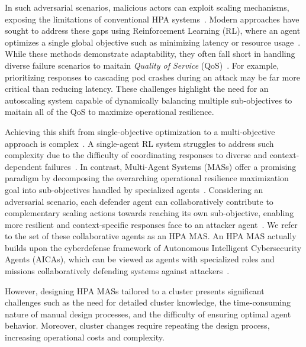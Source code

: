 \documentclass[conference]{IEEEtran}
\begin{document}
In such adversarial scenarios, malicious actors can exploit scaling mechanisms, exposing the limitations of conventional HPA systems~\cite{Kim2020}. Modern approaches have sought to address these gaps using Reinforcement Learning (RL), where an agent optimizes a single global objective such as minimizing latency or resource usage~\cite{Nguyen2019}. While these methods demonstrate adaptability, they often fall short in handling diverse failure scenarios to maitain \textit{Quality of Service} (QoS)~\cite{Castro2020}. For example, prioritizing responses to cascading pod crashes during an attack may be far more critical than reducing latency. These challenges highlight the need for an autoscaling system capable of dynamically balancing multiple sub-objectives to maitain all of the QoS to maximize operational resilience.

Achieving this shift from single-objective optimization to a multi-objective approach is complex~\cite{Shoham2008}. A single-agent RL system struggles to address such complexity due to the difficulty of coordinating responses to diverse and context-dependent failures~\cite{Jennings1998}. In contrast, Multi-Agent Systems (MASs) offer a promising paradigm by decomposing the overarching operational resilience maximization goal into sub-objectives handled by specialized agents~\cite{Shoham2008}. Considering an adversarial scenario, each defender agent can collaboratively contribute to complementary scaling actions towards reaching its own sub-objective, enabling more resilient and context-specific responses face to an attacker agent~\cite{Jennings1998}. We refer to the set of these collaborative agents as an HPA MAS. An HPA MAS actually builds upon the cyberdefense framework of Autonomous Intelligent Cybersecurity Agents (AICAs), which can be viewed as agents with specialized roles and missions collaboratively defending systems against attackers~\cite{Kott2018}.

However, designing HPA MASs tailored to a cluster presents significant challenges such as the need for detailed cluster knowledge, the time-consuming nature of manual design processes, and the difficulty of ensuring optimal agent behavior. Moreover, cluster changes require repeating the design process, increasing operational costs and complexity.
\end{document}
